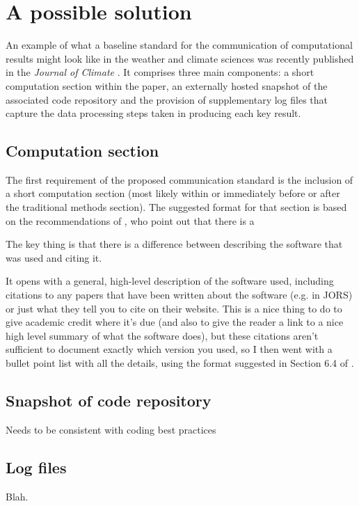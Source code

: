 \section{A possible solution}

An example of what a baseline standard for the communication of computational results might look like in the weather and climate sciences was recently published in the \textit{Journal of Climate} \citep{Irving2015}. It comprises three main components: a short computation section within the paper, an externally hosted snapshot of the associated code repository and the provision of supplementary log files that capture the data processing steps taken in producing each key result. 

\subsection{Computation section}

The first requirement of the proposed communication standard is the inclusion of a short computation section (most likely within or immediately before or after the traditional methods section). The suggested format for that section is based on the recommendations of \citet{Jackson2012}, who point out that there is a    

 The key thing is that there is a difference between describing the software that was used and citing it. 
 
It opens with a general, high-level description of the software used, including citations to any papers that have been written about the software (e.g. in JORS) or just what they tell you to cite on their website. This is a nice thing to do to give academic credit where it's due (and also to give the reader a link to a nice high level summary of what the software does), but these citations aren't sufficient to document exactly which version you used, so I then went with a bullet point list with all the details, using the format suggested in Section 6.4 of \citet{Jackson2012}. 

\subsection{Snapshot of code repository}

Needs to be consistent with coding best practices \citep{Wilson2014a}

\subsection{Log files}

Blah.